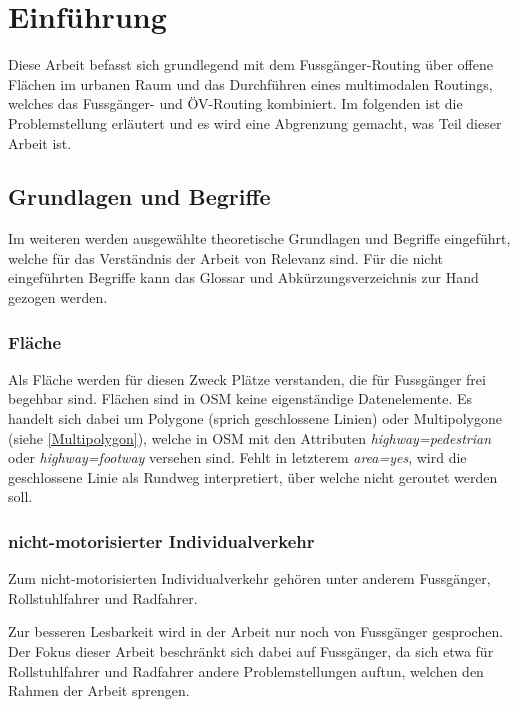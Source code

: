\section{Einführung}
\label{Einführung}
Diese Arbeit befasst sich grundlegend mit dem Fussgänger-Routing über offene Flächen im urbanen Raum und das Durchführen eines multimodalen Routings, welches das Fussgänger- und ÖV-Routing kombiniert. Im folgenden ist die Problemstellung erläutert und es wird eine Abgrenzung gemacht, was Teil dieser Arbeit ist.

\subsection{Grundlagen und Begriffe}
\label{Grundlagen und Begriffe}

Im weiteren werden ausgewählte theoretische Grundlagen und Begriffe eingeführt, welche für das Verständnis der Arbeit von Relevanz sind. Für die nicht eingeführten Begriffe kann das Glossar und Abkürzungsverzeichnis zur Hand gezogen werden.

\subsubsection{Fläche}
\label{Fläche}

Als Fläche werden für diesen Zweck Plätze verstanden, die für Fussgänger frei begehbar sind. Flächen sind in \ac{OSM} keine eigenständige Datenelemente. Es handelt sich dabei um Polygone (sprich geschlossene Linien) oder Multipolygone (siehe \ref{Multipolygon}), welche in \ac{OSM} mit den Attributen \textit{highway=pedestrian} oder \textit{highway=footway} versehen sind. Fehlt in letzterem \textit{area=yes}, wird die geschlossene Linie als Rundweg interpretiert, über welche nicht geroutet werden soll. \cite{osm_wiki_area}

\subsubsection{nicht-motorisierter Individualverkehr}
\label{nicht-motorisierter Individualverkehr}

Zum nicht-motorisierten Individualverkehr gehören unter anderem Fussgänger, Rollstuhlfahrer und Radfahrer.

Zur besseren Lesbarkeit wird in der Arbeit nur noch von Fussgänger gesprochen. Der Fokus dieser Arbeit beschränkt sich dabei auf Fussgänger, da sich etwa für Rollstuhlfahrer und Radfahrer andere Problemstellungen auftun, welchen den Rahmen der Arbeit sprengen. 

